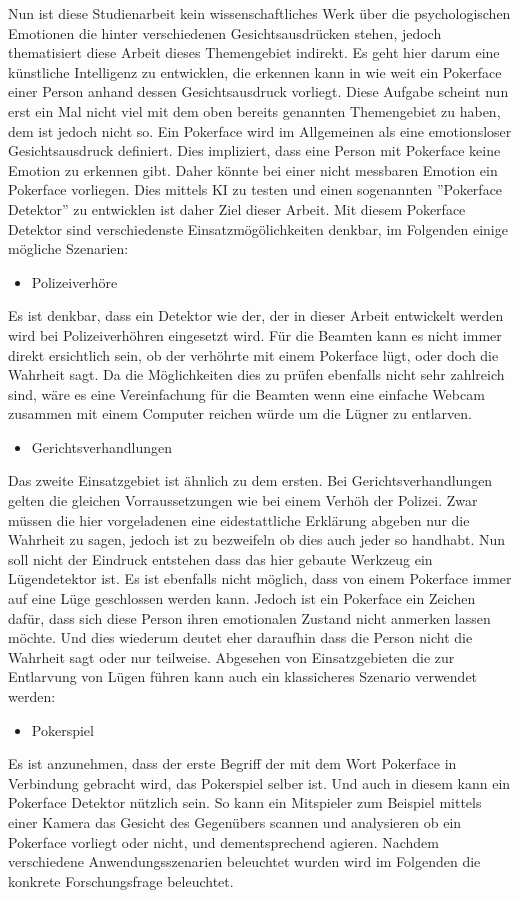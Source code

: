 \documentclass[12pt, a4paper]{scrbook}
\begin{document}
Nun ist diese Studienarbeit kein wissenschaftliches Werk über die psychologischen Emotionen die hinter verschiedenen Gesichtsausdrücken stehen, jedoch thematisiert diese Arbeit dieses Themengebiet indirekt. Es geht hier darum eine künstliche Intelligenz zu entwicklen, die erkennen kann in wie weit ein Pokerface einer Person anhand dessen Gesichtsausdruck vorliegt. Diese Aufgabe scheint nun erst ein Mal nicht viel mit dem oben bereits genannten Themengebiet zu haben, dem ist jedoch nicht so. Ein Pokerface wird im Allgemeinen als eine emotionsloser Gesichtsausdruck definiert. Dies impliziert, dass eine Person mit Pokerface keine Emotion zu erkennen gibt. Daher könnte bei einer nicht messbaren Emotion ein Pokerface vorliegen. Dies mittels KI zu testen und einen sogenannten ''Pokerface Detektor'' zu entwicklen ist daher Ziel dieser Arbeit. Mit diesem Pokerface Detektor sind verschiedenste Einsatzmögölichkeiten denkbar, im Folgenden einige mögliche Szenarien:
\begin{itemize}
	\item{Polizeiverhöre}
\end{itemize}
Es ist denkbar, dass ein Detektor wie der, der in dieser Arbeit entwickelt werden wird bei Polizeiverhöhren eingesetzt wird. Für die Beamten kann es nicht immer direkt ersichtlich sein, ob der verhöhrte mit einem Pokerface lügt, oder doch die Wahrheit sagt. Da die Möglichkeiten dies zu prüfen ebenfalls nicht sehr zahlreich sind, wäre es eine Vereinfachung für die Beamten wenn eine einfache Webcam zusammen mit einem Computer reichen würde um die Lügner zu entlarven.
\begin{itemize}
	\item{Gerichtsverhandlungen}
\end{itemize}
Das zweite Einsatzgebiet ist ähnlich zu dem ersten. Bei Gerichtsverhandlungen gelten die gleichen Vorraussetzungen wie bei einem Verhöh der Polizei. Zwar müssen die hier vorgeladenen eine eidestattliche Erklärung abgeben nur die Wahrheit zu sagen, jedoch ist zu bezweifeln ob dies auch jeder so handhabt. 
Nun soll nicht der Eindruck entstehen dass das hier gebaute Werkzeug ein Lügendetektor ist. Es ist ebenfalls nicht möglich, dass von einem Pokerface immer auf eine Lüge geschlossen werden kann. Jedoch ist ein Pokerface ein Zeichen dafür, dass sich diese Person ihren emotionalen Zustand nicht anmerken lassen möchte. Und dies wiederum deutet eher daraufhin dass die Person nicht die Wahrheit sagt oder nur teilweise. 
Abgesehen von Einsatzgebieten die zur Entlarvung von Lügen führen kann auch ein klassicheres Szenario verwendet werden:
\begin{itemize}
	\item{Pokerspiel}
\end{itemize}
Es ist anzunehmen, dass der erste Begriff der mit dem Wort Pokerface in Verbindung gebracht wird, das Pokerspiel selber ist. Und auch in diesem kann ein Pokerface Detektor nützlich sein. So kann ein Mitspieler zum Beispiel mittels einer Kamera das Gesicht des Gegenübers scannen und analysieren ob ein Pokerface vorliegt oder nicht, und dementsprechend agieren.
Nachdem verschiedene Anwendungsszenarien beleuchtet wurden wird im Folgenden die konkrete Forschungsfrage beleuchtet.
\end{document}
